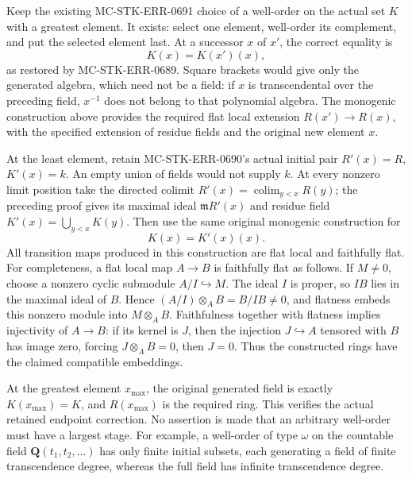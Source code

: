 Keep the existing MC-STK-ERR-0691 choice of a well-order on the actual set \(K\) with a greatest element. It exists: select one element, well-order its complement, and put the selected element last. At a successor \(x\) of \(x'\), the correct equality is \[
 K(x)=K(x')(x),
\] as restored by MC-STK-ERR-0689. Square brackets would give only the generated algebra, which need not be a field: if \(x\) is transcendental over the preceding field, \(x^{-1}\) does not belong to that polynomial algebra. The monogenic construction above provides the required flat local extension \(R(x')\to R(x)\), with the specified extension of residue fields and the original new element \(x\).

At the least element, retain MC-STK-ERR-0690's actual initial pair \(R'(x)=R\), \(K'(x)=k\). An empty union of fields would not supply \(k\). At every nonzero limit position take the directed colimit \(R'(x)=\operatorname*{colim}_{y<x}R(y)\); the preceding proof gives its maximal ideal \(\mathfrak mR'(x)\) and residue field \(K'(x)=\bigcup_{y<x}K(y)\). Then use the same original monogenic construction for \[
 K(x)=K'(x)(x).
\] All transition maps produced in this construction are flat local and faithfully flat. For completeness, a flat local map \(A\to B\) is faithfully flat as follows. If \(M\ne0\), choose a nonzero cyclic submodule \(A/I\hookrightarrow M\). The ideal \(I\) is proper, so \(IB\) lies in the maximal ideal of \(B\). Hence \((A/I)\otimes_A B=B/IB\ne0\), and flatness embeds this nonzero module into \(M\otimes_A B\). Faithfulness together with flatness implies injectivity of \(A\to B\): if its kernel is \(J\), then the injection \(J\hookrightarrow A\) tensored with \(B\) has image zero, forcing \(J\otimes_A B=0\), then \(J=0\). Thus the constructed rings have the claimed compatible embeddings.

At the greatest element \(x_{\max}\), the original generated field is exactly \(K(x_{\max})=K\), and \(R(x_{\max})\) is the required ring. This verifies the actual retained endpoint correction. No assertion is made that an arbitrary well-order must have a largest stage. For example, a well-order of type \(\omega\) on the countable field \(\mathbf Q(t_1,t_2,\ldots)\) has only finite initial subsets, each generating a field of finite transcendence degree, whereas the full field has infinite transcendence degree.

